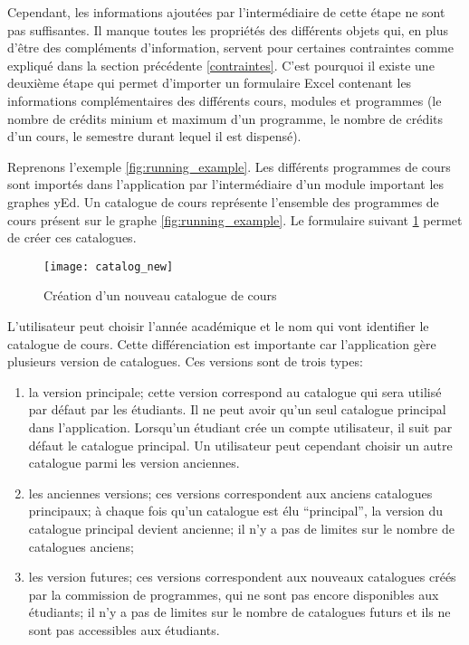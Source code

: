 Cependant, les informations ajoutées par l'intermédiaire de cette étape ne sont pas suffisantes. Il manque toutes les propriétés des différents objets qui, en plus d'être des compléments d'information, servent pour certaines contraintes comme expliqué dans la section précédente \ref{contraintes}. C'est pourquoi il existe une deuxième étape qui permet d'importer un formulaire Excel contenant les informations complémentaires des différents cours, modules et programmes (le nombre de crédits minium et maximum d'un programme, le nombre de crédits d'un cours, le semestre durant lequel il est dispensé). 


Reprenons  l'exemple \ref{fig:running_example}. Les différents programmes de cours sont importés dans l'application par l'intermédiaire d'un module important les graphes yEd. Un catalogue de cours représente l'ensemble des programmes de cours présent sur le graphe \ref{fig:running_example}. Le formulaire suivant \ref{fig:catalog_new_page} permet de créer ces catalogues. 

\begin{figure}
\centering
\caption{Création d'un nouveau catalogue de cours}
\label{fig:catalog_new_page}
\texttt{[image: catalog\_new]}
\end{figure}


L'utilisateur peut choisir l'année académique et le nom qui vont identifier le catalogue de cours. Cette différenciation est importante car l'application gère plusieurs version de catalogues. Ces versions sont de trois types: 

\begin{enumerate}
\item la version principale; cette version correspond au catalogue qui sera utilisé par défaut par les étudiants. Il ne peut avoir qu'un seul catalogue principal dans l'application. Lorsqu'un étudiant crée un compte utilisateur, il suit par défaut le catalogue principal. Un utilisateur peut cependant choisir un autre catalogue parmi les version anciennes. 
\item les anciennes versions; ces versions correspondent aux anciens catalogues principaux; à chaque fois qu'un catalogue est élu ``principal'', la version du catalogue principal devient ancienne; il n'y a pas de limites sur le nombre de catalogues anciens;
\item les version futures; ces versions correspondent aux nouveaux catalogues créés par la commission de programmes, qui ne sont pas encore disponibles aux étudiants; il n'y a pas de limites sur le nombre de catalogues futurs et ils ne sont pas accessibles aux étudiants. 
\end{enumerate}

